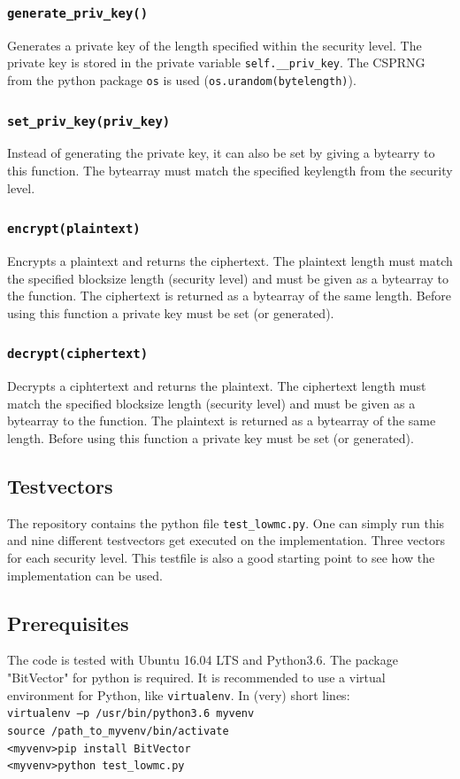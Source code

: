 \documentclass[]{article}
\begin{document}
\subsubsection{\texttt{generate\_priv\_key()}}
Generates a private key of the length specified within the security level. The private key is stored in the private variable \texttt{self.\_\_priv\_key}. The CSPRNG from the python package \texttt{os} is used (\texttt{os.urandom(bytelength)}).
\subsubsection{\texttt{set\_priv\_key(priv\_key)}}
Instead of generating the private key, it can also be set by giving a bytearry to this function. The bytearray must match the specified keylength from the security level.
\subsubsection{\texttt{encrypt(plaintext)}}
Encrypts a plaintext and returns the ciphertext. The plaintext length must match the specified blocksize length (security level) and must be given as a bytearray to the function. The ciphertext is returned as a bytearray of the same length. Before using this function a private key must be set (or generated).
\subsubsection{\texttt{decrypt(ciphertext)}}
Decrypts a ciphtertext and returns the plaintext. The ciphertext length must match the specified blocksize length (security level) and must be given as a bytearray to the function. The plaintext is returned as a bytearray of the same length. Before using this function a private key must be set (or generated).
\subsection{Testvectors}
The repository contains the python file \texttt{test\_lowmc.py}. One can simply run this and nine different testvectors get executed on the implementation. Three vectors for each security level. This testfile is also a good starting point to see how the implementation can be used.
\subsection{Prerequisites}
The code is tested with Ubuntu 16.04 LTS and Python3.6. The package "BitVector" for python is required. It is recommended to use a virtual environment for Python, like \texttt{virtualenv}. In (very) short lines:\\
\texttt{virtualenv --p /usr/bin/python3.6 myvenv}\\
\texttt{source /path\_to\_myvenv/bin/activate}\\
\texttt{<myvenv>pip install BitVector}\\
\texttt{<myvenv>python test\_lowmc.py}\\
\end{document}
